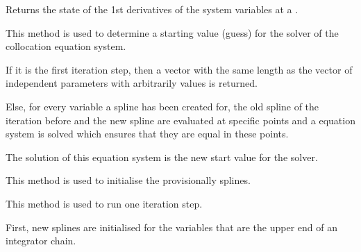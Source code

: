 \documentclass[letterpaper,10pt,english]{sphinxmanual}
\begin{document}
\begin{fulllineitems}
\begin{fulllineitems}
\end{fulllineitems}


\begin{fulllineitems}
\label{pytrajectory:pytrajectory.trajectory.Trajectory.dx}
Returns the state of the 1st derivatives of the system variables at a .

\end{fulllineitems}


\begin{fulllineitems}
\label{pytrajectory:pytrajectory.trajectory.Trajectory.getGuess}
This method is used to determine a starting value (guess) for the
solver of the collocation equation system.

If it is the first iteration step, then a vector with the same length as the vector of
independent parameters with arbitrarily values is returned.

Else, for every variable a spline has been created for, the old spline of the iteration
before and the new spline are evaluated at specific points and a equation system
is solved which ensures that they are equal in these points.

The solution of this equation system is the new start value for the solver.

\end{fulllineitems}


\begin{fulllineitems}
\label{pytrajectory:pytrajectory.trajectory.Trajectory.initSplines}
This method is used to initialise the provisionally splines.

\end{fulllineitems}


\begin{fulllineitems}
\label{pytrajectory:pytrajectory.trajectory.Trajectory.iterate}
This method is used to run one iteration step.

First, new splines are initialised for the variables that are the upper end of an
integrator chain.


\end{fulllineitems}
\end{fulllineitems}
\end{document}
